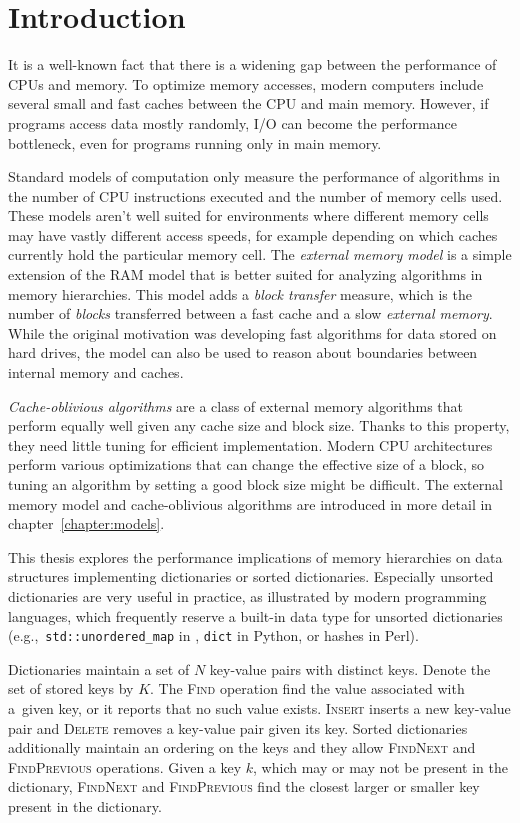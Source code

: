 \chapter*{Introduction}

It is a well-known fact that there is a widening gap between
the performance of CPUs and memory. To optimize memory accesses,
modern computers include several small and fast caches between the CPU and
main memory. However, if programs access data mostly randomly, I/O can become
the performance bottleneck, even for programs running only in main memory.

Standard models of computation only measure the performance of algorithms
in the number of CPU instructions executed and the number of memory cells used.
These models aren't well suited for environments where different memory cells
may have vastly different access speeds, for example depending on which caches
currently hold the particular memory cell. The \emph{external memory model}
is a simple extension of the RAM model that is better suited for analyzing
algorithms in memory hierarchies. This model adds a \emph{block transfer}
measure, which is the number of \emph{blocks} transferred between a fast cache
and a slow \emph{external memory}.
While the original motivation was developing fast algorithms for data stored on
hard drives, the model can also be used to reason about boundaries between
internal memory and caches.

\emph{Cache-oblivious algorithms} are a class of external memory algorithms
that perform equally well given any cache size and block size. Thanks to this
property, they need little tuning for efficient implementation.
Modern CPU architectures perform various optimizations that can change
the effective size of a block, so tuning an algorithm by setting a good block
size might be difficult.
The external memory model and cache-oblivious algorithms are introduced in more
detail in chapter~\ref{chapter:models}.

This thesis explores the performance implications of memory hierarchies
on data structures implementing dictionaries or sorted dictionaries.
Especially unsorted dictionaries are very useful in practice, as illustrated
by modern programming languages, which frequently reserve a built-in
data type for unsorted dictionaries (e.g.,\ \texttt{std::unordered\_map} in
\Cpp{}, \texttt{dict} in Python, or hashes in Perl).

Dictionaries maintain a set of $N$ key-value pairs with distinct keys.
Denote the set of stored keys by $K$.
The \textsc{Find} operation find the value associated with a~given key, or
it reports that no such value exists. \textsc{Insert} inserts a new
key-value pair and \textsc{Delete} removes a key-value pair given its key.
Sorted dictionaries additionally maintain an ordering on the keys and they
allow \textsc{FindNext} and \textsc{FindPrevious} operations.
Given a key $k$, which may or may not be present in the dictionary,
\textsc{FindNext} and \textsc{FindPrevious} find the closest larger or smaller
key present in the dictionary.

